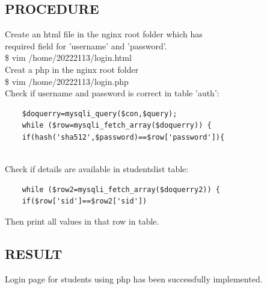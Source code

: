 \documentclass{article}
\begin{document}
\begin{flushleft}
\subsection{PROCEDURE}
\vspace{0.2in}
\textbullet Create an html file in the nginx root folder which has\\ required field for 'username' and 'password'.\\
\vspace{0.1in}\hspace{0.3in}\$ vim /home/20222113/login.html\\
\hspace{0.2in}\textbullet Creat a php in the nginx root folder\\
\vspace{0.1in}\hspace{0.3in}\$ vim /home/20222113/login.php\\
\hspace{0.2in}\textbullet Check if username and password is correct in table 'auth':\\
\begin{verbatim}
    $doquerry=mysqli_query($con,$query);
    while ($row=mysqli_fetch_array($doquerry)) {
    if(hash('sha512',$password)==$row['password']){
\end{verbatim}\\
\hspace{0.2in}\textbullet Check if details are available in studentslist table:\\
\begin{verbatim}
    while ($row2=mysqli_fetch_array($doquerry2)) {
    if($row['sid']==$row2['sid'])
\end{verbatim}
\hspace{0.2in}\textbullet Then print all values in that row in table.\\
\vspace{1in}
\subsection{RESULT}
Login page for students using php has been successfully implemented.
\end{flushleft}
\end{document}
